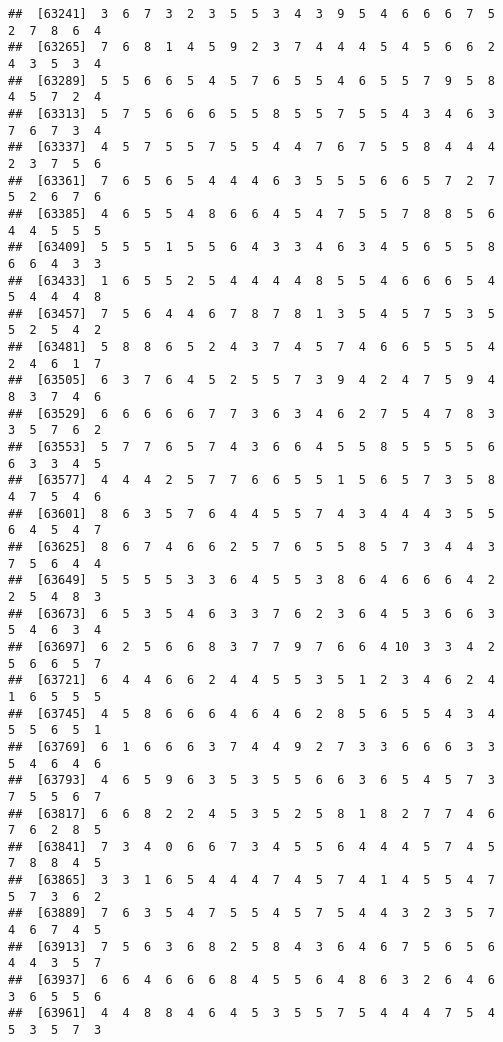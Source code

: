 \documentclass[
]{book}
\begin{document}
\begin{verbatim}
##  [63241]  3  6  7  3  2  3  5  5  3  4  3  9  5  4  6  6  6  7  5  2  7  8  6  4
##  [63265]  7  6  8  1  4  5  9  2  3  7  4  4  4  5  4  5  6  6  2  4  3  5  3  4
##  [63289]  5  5  6  6  5  4  5  7  6  5  5  4  6  5  5  7  9  5  8  4  5  7  2  4
##  [63313]  5  7  5  6  6  6  5  5  8  5  5  7  5  5  4  3  4  6  3  7  6  7  3  4
##  [63337]  4  5  7  5  5  7  5  5  4  4  7  6  7  5  5  8  4  4  4  2  3  7  5  6
##  [63361]  7  6  5  6  5  4  4  4  6  3  5  5  5  6  6  5  7  2  7  5  2  6  7  6
##  [63385]  4  6  5  5  4  8  6  6  4  5  4  7  5  5  7  8  8  5  6  4  4  5  5  5
##  [63409]  5  5  5  1  5  5  6  4  3  3  4  6  3  4  5  6  5  5  8  6  6  4  3  3
##  [63433]  1  6  5  5  2  5  4  4  4  4  8  5  5  4  6  6  6  5  4  5  4  4  4  8
##  [63457]  7  5  6  4  4  6  7  8  7  8  1  3  5  4  5  7  5  3  5  5  2  5  4  2
##  [63481]  5  8  8  6  5  2  4  3  7  4  5  7  4  6  6  5  5  5  4  2  4  6  1  7
##  [63505]  6  3  7  6  4  5  2  5  5  7  3  9  4  2  4  7  5  9  4  8  3  7  4  6
##  [63529]  6  6  6  6  6  7  7  3  6  3  4  6  2  7  5  4  7  8  3  3  5  7  6  2
##  [63553]  5  7  7  6  5  7  4  3  6  6  4  5  5  8  5  5  5  5  6  6  3  3  4  5
##  [63577]  4  4  4  2  5  7  7  6  6  5  5  1  5  6  5  7  3  5  8  4  7  5  4  6
##  [63601]  8  6  3  5  7  6  4  4  5  5  7  4  3  4  4  4  3  5  5  6  4  5  4  7
##  [63625]  8  6  7  4  6  6  2  5  7  6  5  5  8  5  7  3  4  4  3  7  5  6  4  4
##  [63649]  5  5  5  5  3  3  6  4  5  5  3  8  6  4  6  6  6  4  2  2  5  4  8  3
##  [63673]  6  5  3  5  4  6  3  3  7  6  2  3  6  4  5  3  6  6  3  5  4  6  3  4
##  [63697]  6  2  5  6  6  8  3  7  7  9  7  6  6  4 10  3  3  4  2  5  6  6  5  7
##  [63721]  6  4  4  6  6  2  4  4  5  5  3  5  1  2  3  4  6  2  4  1  6  5  5  5
##  [63745]  4  5  8  6  6  6  4  6  4  6  2  8  5  6  5  5  4  3  4  5  5  6  5  1
##  [63769]  6  1  6  6  6  3  7  4  4  9  2  7  3  3  6  6  6  3  3  5  4  6  4  6
##  [63793]  4  6  5  9  6  3  5  3  5  5  6  6  3  6  5  4  5  7  3  7  5  5  6  7
##  [63817]  6  6  8  2  2  4  5  3  5  2  5  8  1  8  2  7  7  4  6  7  6  2  8  5
##  [63841]  7  3  4  0  6  6  7  3  4  5  5  6  4  4  4  5  7  4  5  7  8  8  4  5
##  [63865]  3  3  1  6  5  4  4  4  7  4  5  7  4  1  4  5  5  4  7  5  7  3  6  2
##  [63889]  7  6  3  5  4  7  5  5  4  5  7  5  4  4  3  2  3  5  7  4  6  7  4  5
##  [63913]  7  5  6  3  6  8  2  5  8  4  3  6  4  6  7  5  6  5  6  4  4  3  5  7
##  [63937]  6  6  4  6  6  6  8  4  5  5  6  4  8  6  3  2  6  4  6  3  6  5  5  6
##  [63961]  4  4  8  8  4  6  4  5  3  5  5  7  5  4  4  4  7  5  4  5  3  5  7  3

\end{verbatim}
\end{document}
